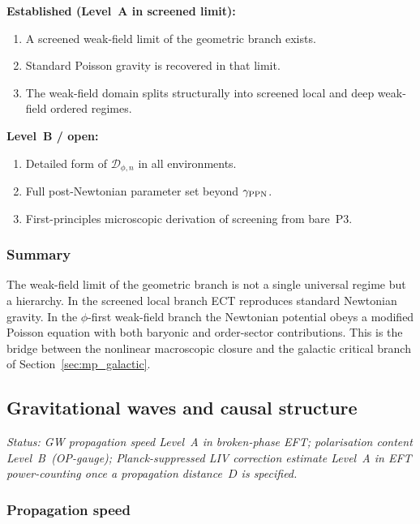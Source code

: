\documentclass[11pt,a4paper]{article}
\numberwithin{equation}{section}
\begin{document}
\textbf{Established (Level~A in screened limit):}
\begin{enumerate}[label=(\roman*)]
  \item A screened weak-field limit of the geometric branch exists.
  \item Standard Poisson gravity is recovered in that limit.
  \item The weak-field domain splits structurally into screened local
    and deep weak-field ordered regimes.
\end{enumerate}

\textbf{Level~B / open:}
\begin{enumerate}[label=(\roman*)]
  \item Detailed form of $\mathcal{D}_{\phi,n}$ in all environments.
  \item Full post-Newtonian parameter set beyond $\gamma_{\rm PPN}$.
  \item First-principles microscopic derivation of screening
    from bare~P3.
\end{enumerate}

\subsubsection*{Summary}

The weak-field limit of the geometric branch is not a single universal
regime but a hierarchy.
In the screened local branch ECT reproduces standard Newtonian gravity.
In the $\phi$-first weak-field branch the Newtonian potential obeys a
modified Poisson equation with both baryonic and order-sector
contributions.
This is the bridge between the nonlinear macroscopic closure and the
galactic critical branch of Section~\ref{sec:mp_galactic}.



\subsection{Gravitational waves and causal structure}
\label{sec:mp_gw}

\textit{Status: GW propagation speed Level~A in broken-phase EFT;
polarisation content Level~B~(OP-gauge);
Planck-suppressed LIV correction estimate Level~A in EFT
power-counting once a propagation distance~$D$ is specified.}

\subsubsection*{Propagation speed}
\end{document}

